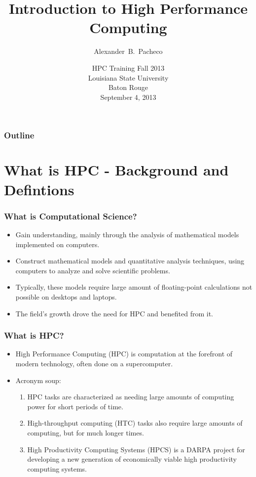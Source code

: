 \documentclass[slidestop,mathserif,compress,xcolor=svgnames,table]{beamer}
\title{Introduction to High Performance Computing}
\author[Alex Pacheco]{\large{Alexander~B.~Pacheco}}
\institute[HPC Training: Fall 2013] {\inst{}\footnotesize{User Services Consultant\\LSU HPC \& LONI\\sys-help@loni.org}}
\date[\hfill{September 4, 2013\hspace{2cm}\insertframenumber/\inserttotalframenumber}]{\scriptsize{HPC Training Fall 2013\\Louisiana State University\\Baton Rouge\\September 4, 2013}}
\begin{document}
\frame{\titlepage}

\normalsize
\begin{frame}[label=toc,squeeze]
  \frametitle{\small{Outline}}
  \tableofcontents
\end{frame}

\section{What is HPC - Background and Defintions}
\begin{frame}
  \frametitle{\small What is Computational Science?}
  \begin{itemize}
    \item Gain understanding, mainly through the analysis of mathematical models implemented on computers.
    \item Construct mathematical models and quantitative analysis techniques, using computers to analyze and solve scientific problems.
    \item Typically, these models require large amount of floating-point calculations not possible on desktops and laptops.
    \item The field's growth drove the need for HPC and benefited from it.
  \end{itemize}
\end{frame}

\begin{frame}
  \frametitle{\small What is HPC?}
  \begin{itemize}
    \item High Performance Computing (HPC) is computation at the forefront of modern technology, often done on a supercomputer. 
    \item Acronym soup:
    \begin{enumerate}
        \item HPC tasks are characterized as needing large amounts of computing power for short periods of time.
        \item High-throughput computing (HTC) tasks also require large amounts of computing, but for much longer times.
        \item High Productivity Computing Systems (HPCS) is a DARPA project for developing a new generation of economically viable high productivity computing systems.
    \end{enumerate}
  \end{itemize}
\end{frame}
\end{document}
